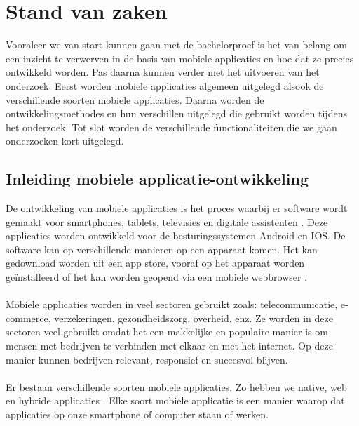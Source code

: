 \chapter{Stand van zaken}
\label{ch:stand-van-zaken}




Vooraleer we van start kunnen gaan met de bachelorproef is het van belang om een inzicht te 
verwerven in de basis van mobiele applicaties en hoe dat ze precies ontwikkeld worden. 
Pas daarna kunnen verder met het uitvoeren van het onderzoek. Eerst worden mobiele applicaties 
algemeen uitgelegd alsook de verschillende soorten mobiele applicaties. 
Daarna worden de ontwikkelingsmethodes en hun verschillen uitgelegd die gebruikt worden tijdens het 
onderzoek. Tot slot worden de verschillende functionaliteiten die we gaan onderzoeken kort uitgelegd.

\section{Inleiding mobiele applicatie-ontwikkeling}

De ontwikkeling van mobiele applicaties is het proces waarbij er software wordt 
gemaakt voor smartphones, tablets, televisies en digitale assistenten \autocite{Palko2021}. 
Deze applicaties worden ontwikkeld voor de besturingssystemen Android en IOS. 
De software kan op verschillende manieren op een apparaat komen. Het kan gedownload 
worden uit een app store, vooraf op het apparaat worden geïnstalleerd of het kan worden 
geopend via een mobiele webbrowser \autocite{IBM2023}. 
\\\\
Mobiele applicaties worden in veel sectoren gebruikt zoals: telecommunicatie, 
e-commerce, verzekeringen, gezondheidszorg, overheid, enz. Ze worden in deze sectoren 
veel gebruikt omdat het een makkelijke en populaire manier is om mensen met bedrijven te 
verbinden met elkaar en met het internet. Op deze manier kunnen bedrijven relevant, responsief 
en succesvol blijven. 
\\\\
Er bestaan verschillende soorten mobiele applicaties. Zo hebben we native, web en hybride 
applicaties \autocite{AWS2023}. Elke soort mobiele applicatie is een manier waarop dat 
applicaties op onze smartphone of computer staan of werken.

